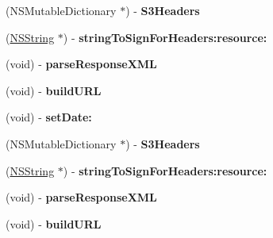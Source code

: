 \begin{DoxyCompactItemize}
\item 
\hypertarget{interface_a_s_i_s3_request_ae9241f3e6890675b37ebcc612a4112b3}{
(\-N\-S\-Mutable\-Dictionary $\ast$) -\/ {\bfseries \-S3\-Headers}}
\label{interface_a_s_i_s3_request_ae9241f3e6890675b37ebcc612a4112b3}

\item 
\hypertarget{interface_a_s_i_s3_request_a6186d54d09b61de7f1929707a983a95b}{
(\hyperlink{class_n_s_string}{\-N\-S\-String} $\ast$) -\/ {\bfseries string\-To\-Sign\-For\-Headers\-:resource\-:}}
\label{interface_a_s_i_s3_request_a6186d54d09b61de7f1929707a983a95b}

\item 
\hypertarget{interface_a_s_i_s3_request_a537b485990a0b0b1cf22d122439b89e1}{
(void) -\/ {\bfseries parse\-Response\-X\-M\-L}}
\label{interface_a_s_i_s3_request_a537b485990a0b0b1cf22d122439b89e1}

\item 
\hypertarget{interface_a_s_i_s3_request_ace59aaf9a74564868fc1f426b363e5bb}{
(void) -\/ {\bfseries build\-U\-R\-L}}
\label{interface_a_s_i_s3_request_ace59aaf9a74564868fc1f426b363e5bb}

\item 
\hypertarget{interface_a_s_i_s3_request_a3eb32c464e0663e896f97338e45fcbcc}{
(void) -\/ {\bfseries set\-Date\-:}}
\label{interface_a_s_i_s3_request_a3eb32c464e0663e896f97338e45fcbcc}

\item 
\hypertarget{interface_a_s_i_s3_request_ae9241f3e6890675b37ebcc612a4112b3}{
(\-N\-S\-Mutable\-Dictionary $\ast$) -\/ {\bfseries \-S3\-Headers}}
\label{interface_a_s_i_s3_request_ae9241f3e6890675b37ebcc612a4112b3}

\item 
\hypertarget{interface_a_s_i_s3_request_a6186d54d09b61de7f1929707a983a95b}{
(\hyperlink{class_n_s_string}{\-N\-S\-String} $\ast$) -\/ {\bfseries string\-To\-Sign\-For\-Headers\-:resource\-:}}
\label{interface_a_s_i_s3_request_a6186d54d09b61de7f1929707a983a95b}

\item 
\hypertarget{interface_a_s_i_s3_request_a537b485990a0b0b1cf22d122439b89e1}{
(void) -\/ {\bfseries parse\-Response\-X\-M\-L}}
\label{interface_a_s_i_s3_request_a537b485990a0b0b1cf22d122439b89e1}

\item 
\hypertarget{interface_a_s_i_s3_request_ace59aaf9a74564868fc1f426b363e5bb}{
(void) -\/ {\bfseries build\-U\-R\-L}}
\label{interface_a_s_i_s3_request_ace59aaf9a74564868fc1f426b363e5bb}


\end{DoxyCompactItemize}
